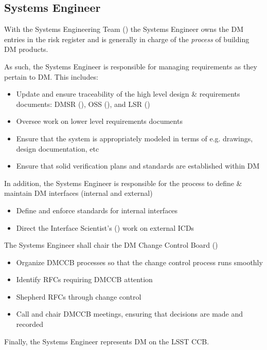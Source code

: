 \subsection{Systems Engineer \label{role:sysengineer}}

With the Systems Engineering Team () the Systems Engineer owns the DM entries in the risk register and is generally in charge of the \textit{process} of building DM products.

As such, the Systems Engineer is responsible for managing requirements as they pertain to DM.
This includes:

\begin{itemize}
\item Update and ensure traceability of the high level design \& requirements documents: DMSR (), OSS (), and LSR ()
\item Oversee work on lower level requirements documents
\item Ensure  that the system is appropriately modeled in terms of e.g. drawings, design documentation, etc
\item Ensure  that solid verification plans and standards are established within DM
\end{itemize}

In addition, the Systems Engineer is responsible for the process to define \& maintain DM interfaces (internal and external)

\begin{itemize}
\item Define and enforce standards for internal interfaces
\item Direct the Interface Scientist's () work on external ICDs
\end{itemize}

The Systems Engineer shall chair the DM Change Control Board ()

\begin{itemize}
\item Organize DMCCB processes so that the change control process runs smoothly
\item Identify RFCs requiring DMCCB attention
\item Shepherd RFCs through change control
\item Call and chair DMCCB meetings, ensuring that decisions are made and recorded
\end{itemize}

Finally, the Systems Engineer represents DM on the LSST CCB.

